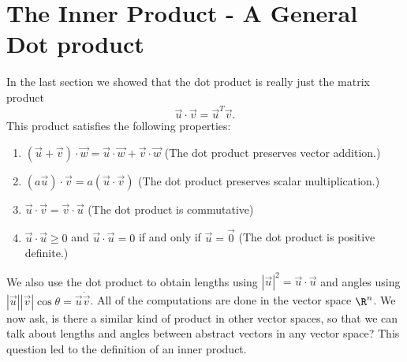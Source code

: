  
 
 
 
 
 
 
 
 
 
 
 
\section{The Inner Product - A General Dot product}
In the last section we showed that the dot product is really just the matrix product $$\vec u\cdot \vec v = \vec u^T\vec v.$$ 
This product satisfies the following properties:
\begin{enumerate}
\item $(\vec u +\vec v)\cdot \vec w = \vec u\cdot \vec w + \vec v\cdot \vec w$ (The dot product preserves vector addition.)
\item $(a\vec u)\cdot \vec v = a(\vec u\cdot \vec v)$ (The dot product preserves scalar multiplication.)
\item $\vec u\cdot \vec v = \vec v\cdot \vec u$ (The dot product is commutative) 
\item $\vec u\cdot \vec u \geq 0$ and $\vec u\cdot\vec u=0$ if and only if $\vec u =\vec 0$ (The dot product is positive definite.)
\end{enumerate}
We also use the dot product to obtain lengths using $|\vec u|^2 = \vec u\cdot \vec u$ and angles using $|\vec u||\vec v| \cos\theta = \vec u\dot \vec v$. All of the computations are done in the vector space $\R^n$. We now ask, is there a similar kind of product in other vector spaces, so that we can talk about lengths and angles between abstract vectors in any vector space? This question led to the definition of an inner product.




